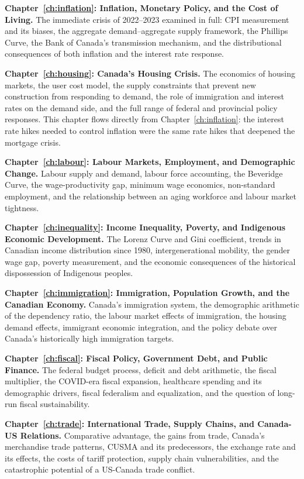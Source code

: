 \textbf{Chapter~\ref{ch:inflation}: Inflation, Monetary Policy, and the Cost of Living.}
The immediate crisis of 2022--2023 examined in full: CPI measurement and its
biases, the aggregate demand--aggregate supply framework, the Phillips Curve,
the Bank of Canada's transmission mechanism, and the distributional consequences
of both inflation and the interest rate response.

\textbf{Chapter~\ref{ch:housing}: Canada's Housing Crisis.}
The economics of housing markets, the user cost model, the supply constraints
that prevent new construction from responding to demand, the role of
immigration and interest rates on the demand side, and the full range of
federal and provincial policy responses. This chapter flows directly from
Chapter~\ref{ch:inflation}: the interest rate hikes needed to control
inflation were the same rate hikes that deepened the mortgage crisis.

\textbf{Chapter~\ref{ch:labour}: Labour Markets, Employment, and Demographic Change.}
Labour supply and demand, labour force accounting, the Beveridge Curve, the
wage-productivity gap, minimum wage economics, non-standard employment, and
the relationship between an aging workforce and labour market tightness.

\textbf{Chapter~\ref{ch:inequality}: Income Inequality, Poverty, and Indigenous Economic Development.}
The Lorenz Curve and Gini coefficient, trends in Canadian income distribution
since 1980, intergenerational mobility, the gender wage gap, poverty
measurement, and the economic consequences of the historical dispossession
of Indigenous peoples.

\textbf{Chapter~\ref{ch:immigration}: Immigration, Population Growth, and the Canadian Economy.}
Canada's immigration system, the demographic arithmetic of the dependency
ratio, the labour market effects of immigration, the housing demand effects,
immigrant economic integration, and the policy debate over Canada's
historically high immigration targets.

\textbf{Chapter~\ref{ch:fiscal}: Fiscal Policy, Government Debt, and Public Finance.}
The federal budget process, deficit and debt arithmetic, the fiscal multiplier,
the COVID-era fiscal expansion, healthcare spending and its demographic drivers,
fiscal federalism and equalization, and the question of long-run fiscal
sustainability.

\textbf{Chapter~\ref{ch:trade}: International Trade, Supply Chains, and Canada-US Relations.}
Comparative advantage, the gains from trade, Canada's merchandise trade
patterns, CUSMA and its predecessors, the exchange rate and its effects,
the costs of tariff protection, supply chain vulnerabilities, and the
catastrophic potential of a US-Canada trade conflict.

